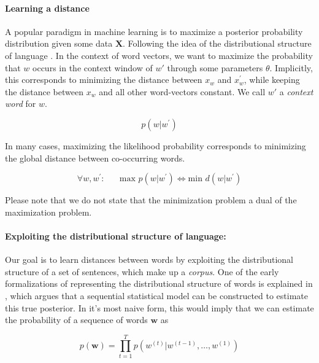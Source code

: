 \documentclass[a4paper,12pt,twoside,openright]{report}
\begin{document}
\paragraph{Learning a distance}
A popular paradigm in machine learning is to maximize a posterior probability distribution given some data $\mathbf{X}$.
Following the idea of the distributional structure of language \cite{harris54}.
In the context of word vectors, we want to maximize the probability that $w$ occurs in the context window of $w \prime$ through some parameters $\theta$.
Implicitly, this corresponds to minimizing the distance between $x_w$ and $x_w^{\prime}$, while keeping the distance between $x_w$ and all other word-vectors constant. 
We call $w \prime$ a \textit{context word} for $w$.

\begin{equation}
p \left(w | w^{\prime}\right)
\end{equation}

In many cases, maximizing the likelihood probability corresponds to minimizing the global distance between co-occurring words.

\begin{equation}
\forall w, w^{\prime} : \hspace{20pt} \text{max } p \left(w | w^{\prime}\right) \iff \text{min } d(w | w^{\prime})
\end{equation}

Please note that we do not state that the minimization problem a dual of the maximization problem.

\paragraph{Exploiting the distributional structure of language:} Our goal is to learn distances between words by exploiting the distributional structure of a set of sentences, which make up a \textit{corpus}. 
One of the early formalizations of representing the distributional structure of words is explained in \cite{bengio03}, which argues that a sequential statistical model can be constructed to estimate this true posterior.  
In it's most naive form, this would imply that we can estimate the probability of a sequence of words $\mathbf{w}$ as

\begin{equation}
p(\mathbf{w}) = \prod_{t=1}^T p\left( w^{(t)} | w^{(t -1)}, \ldots, w^{(1)} \right)
\label{eq:naive_sequential_probability}
\end{equation}
\end{document}
